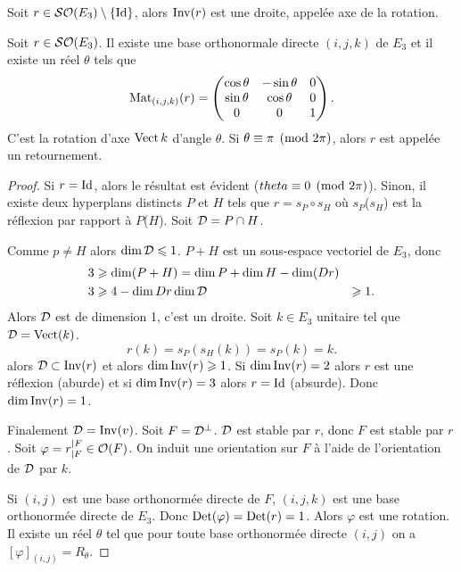 \begin{defdef}
  Soit $r \in \mathcal{SO}\!\left(E_3\right)\setminus\{\operatorname{Id}\}$, alors $\operatorname{Inv}(r)$ est une droite, appelée axe de la rotation.
\end{defdef}

\begin{prop}
  Soit $r \in \mathcal{SO}\!\left(E_3\right)$. Il existe une base orthonormale directe $(i, j, k)$ de $E_3$ et il existe un réel $\theta$ tels que
  \begin{equation}
    \mathrm{Mat}_{(i, j, k)}(r) = \begin{pmatrix} \cos \theta & -\sin\theta & 0 \\ \sin\theta & \cos\theta & 0 \\ 0& 0 &1 \end{pmatrix}.
  \end{equation}
  C'est la rotation d'axe $\operatorname{Vect}{k}$ d'angle $\theta$. Si $\theta \equiv \pi \pmod {2\pi}$, alors $r$ est appelée un retournement.
\end{prop}
\begin{proof}
  Si $r=\operatorname{Id}$, alors le résultat est évident ($theta \equiv 0 \pmod {2\pi}$). Sinon, il existe deux hyperplans distincts $P$ et $H$ tels que $r=s_P \circ s_H$ où $s_P$($s_H$) est la réflexion par rapport à $P$($H$). Soit $\mathcal{D} = P \cap H$.

  Comme $p \neq H$ alors $\operatorname{dim} \mathcal{D} \leqslant 1$. $P+H$ est un sous-espace vectoriel de $E_3$, donc
  \begin{align}
    3 &\geqslant \operatorname{dim}(P+H) = \operatorname{dim} P +\operatorname{dim} H -\operatorname{dim}(Dr) \\
    3 &\geqslant 4 - \operatorname{dim} Dr
    \operatorname{dim} \mathcal{D} &\geqslant 1.
  \end{align}
  Alors $\mathcal{D}$ est de dimension 1, c'est un droite. Soit $k \in E_3$ unitaire tel que $\mathcal{D} = \operatorname{Vect}(k)$.
  \begin{equation}
    r(k) = s_P(s_H(k))=s_P(k)=k.
  \end{equation}
  alors $\mathcal{D} \subset \operatorname{Inv}(r)$ et alors $\operatorname{dim} \operatorname{Inv}(r) \geqslant 1$. Si $\operatorname{dim} \operatorname{Inv}(r)=2$ alors $r$ est une réflexion (aburde) et si $\operatorname{dim} \operatorname{Inv}(r)=3$ alors $r=\operatorname{Id}$ (absurde). Donc $\operatorname{dim}\operatorname{Inv}(r)=1$.

  Finalement $\mathcal{D} = \operatorname{Inv}(v)$. Soit $F=\mathcal{D}^\perp$. $\mathcal{D}$ est stable par $r$, donc $F$ est stable par $r$. Soit $\varphi=r_{|F}^{|F} \in \mathcal{O}\!\left(F\right)$. On induit une orientation sur $F$ à l'aide de l'orientation de $\mathcal{D}$ par $k$.

  Si $(i, j)$ est une base orthonormée directe de $F$, $(i, j, k)$ est une base orthonormée directe de $E_3$. Donc $\operatorname{Det}(\varphi)=\operatorname{Det}(r)=1$. Alors $\varphi$ est une rotation. Il existe un réel $\theta$ tel que pour toute base orthonormée directe $(i, j)$ on a $[\varphi]_{(i, j)}=R_\theta$.
\end{proof}

